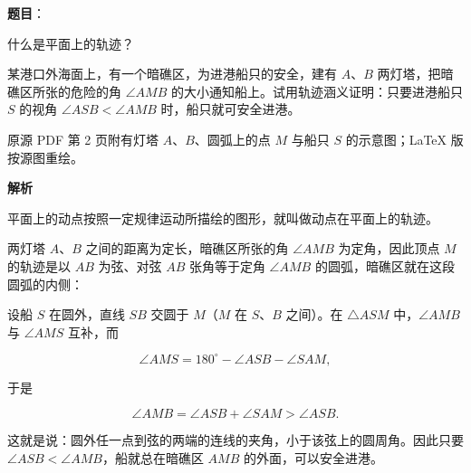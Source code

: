 \begin{answer}

\textbf{题目}：

什么是平面上的轨迹？

某港口外海面上，有一个暗礁区，为进港船只的安全，建有 $A\text{、}B$ 两灯塔，把暗礁区所张的危险的角 $\angle AMB$ 的大小通知船上。试用轨迹涵义证明：只要进港船只 $S$ 的视角 $\angle ASB<\angle AMB$ 时，船只就可安全进港。

\begin{gktip}
原源 PDF 第 2 页附有灯塔 $A\text{、}B$、圆弧上的点 $M$ 与船只 $S$ 的示意图；LaTeX 版按源图重绘。
\end{gktip}
\nopagebreak[4]
\begin{center}\end{center}
\nopagebreak[4]
\textbf{解析}

平面上的动点按照一定规律运动所描绘的图形，就叫做动点在平面上的轨迹。

两灯塔 $A\text{、}B$ 之间的距离为定长，暗礁区所张的角 $\angle AMB$ 为定角，因此顶点 $M$ 的轨迹是以 $AB$ 为弦、对弦 $AB$ 张角等于定角 $\angle AMB$ 的圆弧，暗礁区就在这段圆弧的内侧：
\nopagebreak[4]
\begin{center}\end{center}
\nopagebreak[4]
设船 $S$ 在圆外，直线 $SB$ 交圆于 $M$（$M$ 在 $S$、$B$ 之间）。在 $\triangle ASM$ 中，$\angle AMB$ 与 $\angle AMS$ 互补，而

\nopagebreak[4]
\[
\angle AMS=180^\circ-\angle ASB-\angle SAM,
\]

于是

\nopagebreak[4]
\[
\angle AMB=\angle ASB+\angle SAM>\angle ASB.
\]

这就是说：圆外任一点到弦的两端的连线的夹角，小于该弦上的圆周角。因此只要 $\angle ASB<\angle AMB$，船就总在暗礁区 $AMB$ 的外面，可以安全进港。


\end{answer}
